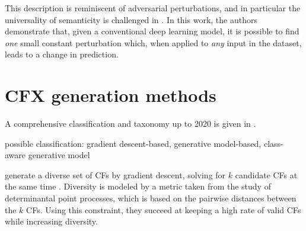 \documentclass[../main.tex]{subfiles}
\begin{document}
This description is reminiscent of adversarial perturbations, and in particular the universality of semanticity is challenged in \cite{moosavi-dezfooliUniversal2017}.
In this work, the authors demonstrate that, given a conventional deep learning model, it is possible to find \emph{one} small constant perturbation which, when applied to \emph{any} input in the dataset, leads to a change in prediction.



\section{CFX generation methods}

A comprehensive classification and taxonomy up to 2020 is given in \cite{vermaCounterfactual2020}.




possible classification: gradient descent-based, generative model-based, class-aware generative model \citenote{}

\citeauthor{mothilalExplaining2020} generate a diverse set of CFs by gradient descent, solving for $k$ candidate CFs at the same time \cite{mothilalExplaining2020}.
Diversity is modeled by a metric taken from the study of determinantal point processes, which is based on the pairwise distances between the $k$ CFs.
Using this constraint, they succeed at keeping a high rate of valid CFs while increasing diversity.
\end{document}
